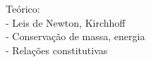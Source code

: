 \documentclass[preview]{standalone}
\begin{document}
Teórico:\\- Leis de Newton, Kirchhoff\\- Conservação de massa, energia\\- Relações constitutivas\\
\end{document}
